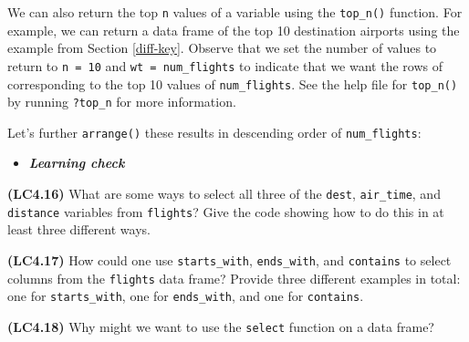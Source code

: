 \documentclass[12pt, krantz2,]{krantz}
\makeatletter
\newenvironment{Shaded}{\begin{snugshade}}{\end{snugshade}}
\newcommand{\DataTypeTok}[1]{\textcolor[rgb]{0.27,0.27,0.27}{#1}}
\newcommand{\DecValTok}[1]{\textcolor[rgb]{0.06,0.06,0.06}{#1}}
\newcommand{\KeywordTok}[1]{\textcolor[rgb]{0.27,0.27,0.27}{\textbf{#1}}}
\newcommand{\NormalTok}[1]{#1}
\newcommand{\OperatorTok}[1]{\textcolor[rgb]{0.43,0.43,0.43}{\textbf{#1}}}
\newcommand{\StringTok}[1]{\textcolor[rgb]{0.5,0.5,0.5}{#1}}
\newenvironment{kframe}{%
\medskip{}
\setlength{\fboxsep}{.8em}
 \def\at@end@of@kframe{}%
 \ifinner\ifhmode%
  \def\at@end@of@kframe{\end{minipage}}%
  \begin{minipage}{\columnwidth}%
 \fi\fi%
 \def\FrameCommand##1{\hskip\@totalleftmargin \hskip-\fboxsep
 \colorbox{shadecolor}{##1}\hskip-\fboxsep
     \hskip-\linewidth \hskip-\@totalleftmargin \hskip\columnwidth}%
 \MakeFramed {\advance\hsize-\width
   \@totalleftmargin\z@ \linewidth\hsize
   \@setminipage}}%
 {\par\unskip\endMakeFramed%
 \at@end@of@kframe}
\renewenvironment{Shaded}{\begin{kframe}}{\end{kframe}}
\newenvironment{rmdblock}[1]
  {\begin{shaded*}
  \begin{itemize}
  \renewcommand{\labelitemi}{
    \raisebox{-.7\height}[0pt][0pt]{
    }
  }
  \item
  }
  {
  \end{itemize}
  \end{shaded*}
  }
\newenvironment{learncheck}
  {\begin{rmdblock}{warning}}
  {\end{rmdblock}}
\makeatother
\begin{document}
We can also return the top \texttt{n} values of a variable using the \texttt{top\_n()} function. For example, we can return a data frame of the top 10 destination airports using the example from Section \ref{diff-key}. Observe that we set the number of values to return to \texttt{n\ =\ 10} and \texttt{wt\ =\ num\_flights} to indicate that we want the rows of corresponding to the top 10 values of \texttt{num\_flights}. See the help file for \texttt{top\_n()} by running \texttt{?top\_n} for more information.

\begin{Shaded}
\end{Shaded}

Let's further \texttt{arrange()} these results in descending order of \texttt{num\_flights}:

\begin{Shaded}
\end{Shaded}

\begin{learncheck}
\textbf{\emph{Learning check}}
\end{learncheck}

\textbf{(LC4.16)} What are some ways to select all three of the \texttt{dest}, \texttt{air\_time}, and \texttt{distance} variables from \texttt{flights}? Give the code showing how to do this in at least three different ways.

\textbf{(LC4.17)} How could one use \texttt{starts\_with}, \texttt{ends\_with}, and \texttt{contains} to select columns from the \texttt{flights} data frame? Provide three different examples in total: one for \texttt{starts\_with}, one for \texttt{ends\_with}, and one for \texttt{contains}.

\textbf{(LC4.18)} Why might we want to use the \texttt{select} function on a data frame?
\end{document}
